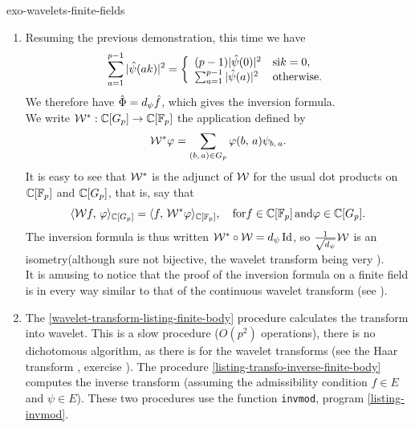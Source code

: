 \begin{correction}{exo-wavelets-finite-fields}
\begin{enumerate}
\item Resuming the previous demonstration, this time we have
\begin{equation*}
\sum_{a = 1}^{p-1}{| \hat{\psi} (ak) |^2} = \left\{\begin{array}{ll} (p-1) | \hat{\psi} (0) |^2 & \text{si} k = 0, \\\sum_{a = 1}^{p-1}{| \hat{\psi} (a) |^2} & \text{otherwise}. \end{array} \right.
\end{equation*}
We therefore have $ \hat{\Phi} = d_\psi \hat{f} $, which gives the inversion formula. \\We write $ \mathcal{W}^*: \mathbb{C} [G_p] \rightarrow \mathbb{C} [ \mathbb{F}_p] $ the application defined by
\begin{equation*}
\mathcal{W}^* \varphi = \sum_{(b, \, a) \in G_p}{\varphi (b, \, a) \psi_{b, \, a}}.
\end{equation*}
It is easy to see that $ \mathcal{W}^* $ is the adjunct of $ \mathcal{W} $ for the usual dot products on $ \mathbb{C} [\mathbb{F}_p] $ and $ \mathbb{C} [G_p] $, that is, say that
\begin{equation*}
\langle \mathcal{W} f,\,\varphi\rangle_{\mathbb{C} [G_p]} = \langle f,\,\mathcal{W}^* \varphi\rangle_{\mathbb{C} [\mathbb{F}_p]}, \quad \text{for} f \in \mathbb{C} [\mathbb{F}_p] \, \text{and} \varphi \in \mathbb{C} [G_p].
\end{equation*}
The inversion formula is thus written $ \mathcal{W}^* \circ \mathcal{W} = d_\psi \operatorname{Id} $, so $ \tfrac{1}{\sqrt{d_\psi}} \mathcal{W} $ is an isometry(although sure not bijective, the wavelet transform being very ). \\It is amusing to notice that the proof of the inversion formula on a finite field is in every way similar to that of the continuous wavelet transform (see \cite{mallat}).
\item {} The \Matlab{} \ref{wavelet-transform-listing-finite-body} procedure calculates the transform into wavelet. This is a slow procedure ($ O(p^2) $ operations), there is no dichotomous algorithm, as there is for the  wavelet transforms (see the Haar transform , exercise ). The procedure \ref{listing-transfo-inverse-finite-body} computes the inverse transform (assuming the admissibility condition $ f \in E $ and $ \psi \in E $). These two procedures use the function \texttt{invmod}, program \ref{listing-invmod}.


\end{enumerate}
\end{correction}
